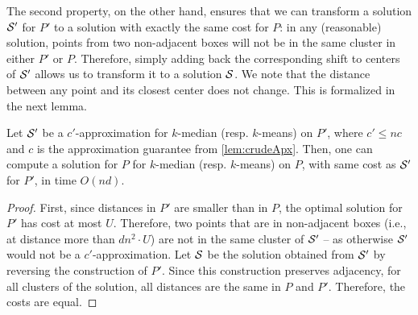 The second property, on the other hand, ensures that we can transform a solution $\mathcal S'$ for $P'$ to a solution with exactly the same cost for $P$: in any
(reasonable) solution, points from two non-adjacent boxes will not be in the same cluster in either $P'$ or $P$. Therefore, simply adding back the corresponding
shift to centers of $\mathcal S'$ allows us to transform it to a solution $\mathcal S$. We note that the distance between any point and its closest center does not
change. This is formalized in the next lemma.

\begin{lemma}
Let $\mathcal S'$ be a $c'$-approximation for  $k$-median (resp. $k$-means) on $P'$, where $c' \leq nc$ and $c$ is the approximation guarantee from
\cref{lem:crudeApx}. Then, one can compute a solution for $P$ for $k$-median (resp. $k$-means) on $P$, with same cost as $\mathcal S'$ for $P'$, in time $O(nd)$.
\end{lemma}
\begin{proof}

First, since distances in $P'$ are smaller than in $P$, the optimal solution for $P'$ has cost at most $U$. Therefore, two points that are in non-adjacent boxes
(i.e., at distance more than $d n^2\cdot U$) are not in the same cluster of $\mathcal S'$ -- as otherwise $\mathcal S'$ would not be a $c'$-approximation.  Let $\mathcal S$ be
the solution obtained from $\mathcal S'$ by reversing the construction of $P'$. Since this construction preserves adjacency, for all clusters of the solution, all
distances are the same in $P$ and $P'$. Therefore, the costs are equal.
\end{proof}
